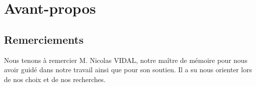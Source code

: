 \documentclass[a4paper, 12pt]{article} %
\makeatletter
\renewcommand{\maketitle}{ %
\begin{flushright} %
{\LARGE\@title} %

\vspace{50pt} %

{\large\@author} %

\vspace{40pt} %
\end{flushright}
}
\makeatother
\begin{document}



%
%


\tableofcontents
\newpage
\section{Avant-propos}
\subsection{Remerciements}
Nous tenons à remercier M. Nicolas VIDAL, notre maître de mémoire pour nous avoir guidé dans notre travail ainsi que pour son soutien. Il a su nous orienter lors de nos choix et de nos recherches.

\newpage
\end{document}

